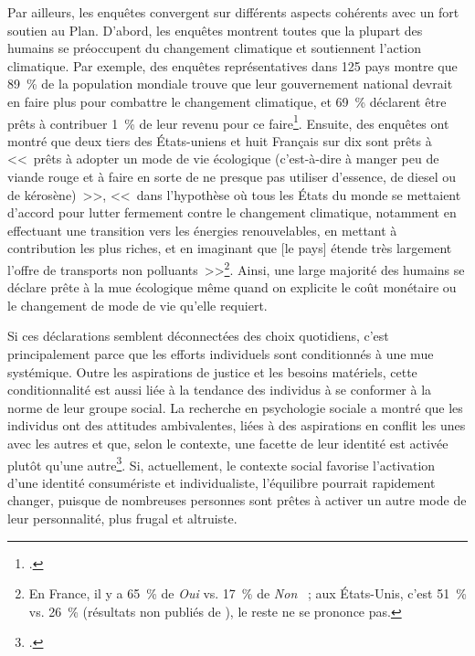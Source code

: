 \documentclass[a5paper,french,openany]{memoir}
\begin{document}
Par ailleurs, les enquêtes convergent sur différents aspects cohérents avec un fort soutien au Plan. D'abord, les enquêtes montrent toutes que la plupart des humains se préoccupent du changement climatique et soutiennent l'action climatique. Par exemple, des enquêtes représentatives dans 125 pays montre que 89~\% de la population mondiale trouve que leur gouvernement national devrait en faire plus pour combattre le changement climatique, et 69~\% déclarent être prêts à contribuer 1~\% de leur revenu pour ce faire\footnote{\cite{andre_actual_2024}.}. %
Ensuite, des enquêtes ont montré que deux tiers des États-uniens et huit Français sur dix sont prêts à <<~prêts à adopter un mode de vie écologique (c'est-à-dire à manger peu de viande rouge et à faire en sorte de ne presque pas utiliser d'essence, de diesel ou de
kérosène)~>>, <<~dans l'hypothèse où tous les États du monde se mettaient d'accord pour lutter fermement contre le changement climatique, notamment en effectuant une
transition vers les énergies renouvelables, en mettant à contribution les plus riches, et en imaginant que [le pays] étende très largement l'offre de transports non polluants~>>\footnote{En France, il y a 65~\% de \textit{Oui} vs. 17~\% de \textit{Non} \citep{douenne_french_2020}~; aux États-Unis, c'est 51~\% vs. 26~\% (résultats non publiés de \citealp{dechezlepretre_fighting_2022}), le reste ne se prononce pas.}. %
Ainsi, une large majorité des humains se déclare prête à la mue écologique même quand on explicite le coût monétaire ou le changement de mode de vie qu'elle requiert. 

Si ces déclarations semblent déconnectées des choix quotidiens, c'est principalement parce que les efforts individuels sont conditionnés à une mue systémique. Outre les aspirations de justice et les besoins matériels, cette conditionnalité est aussi liée à la tendance des individus à se conformer à la norme de leur groupe social. La recherche en psychologie sociale a montré que les individus ont des attitudes ambivalentes, liées à des aspirations en conflit les unes avec les autres et que, selon le contexte, une facette de leur identité est activée plutôt qu'une autre\footnote{\cite{fielding_social_2016,kim_normative_2012}.}. Si, actuellement, le contexte social favorise l'activation d'une identité consumériste et individualiste, l'équilibre pourrait rapidement changer, puisque de nombreuses personnes sont prêtes à activer un autre mode de leur personnalité, plus frugal et altruiste.
\end{document}
